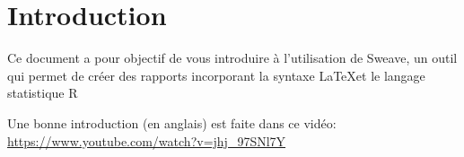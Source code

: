 \documentclass[11pt,english,francais]{article}
\begin{document}
\section{Introduction}
\label{sec:introduction}

Ce document a pour objectif de vous introduire à l'utilisation de
Sweave, un outil qui permet de créer des rapports incorporant la
syntaxe \LaTeX et le langage statistique R

Une bonne introduction (en anglais) est faite dans ce vidéo:
\url{https://www.youtube.com/watch?v=jhj_97SNl7Y}
\end{document}
